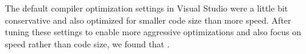 The default compiler optimization settings in Visual Studio were a little bit conservative and also optimized for smaller code size than more speed. After tuning these settings to enable more aggressive optimizations and also focus on speed rather than code size, we found that .